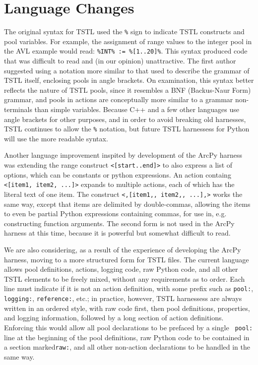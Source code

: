 \section{Language Changes}

The original syntax for TSTL \cite{NFM15} used the {\tt \%} sign to
indicate TSTL constructs and pool variables.  For example, the
assignment of range values to the integer pool in the AVL example
would read:  {\tt \%INT\% := \%[1..20]\%}.  This syntax
produced code that was difficult to read and (in our opinion) unattractive.  The first
author suggested using a notation more similar to that used to
describe the grammar of TSTL itself, enclosing pools in angle
brackets.  On examination, this syntax better reflects the nature of
TSTL pools, since it resembles a BNF (Backus-Naur Form) grammar, and
pools in actions are
conceptually more similar to a grammar non-terminals than simple variables.  Because
C++ and a few other languages use angle brackets for other purposes,
and in order to avoid breaking old harnesses, TSTL continues to allow
the {\tt \%} notation, but future TSTL harnessess for Python will use
the more readable syntax.

Another language improvement inspited by development of the ArcPy harness was
extending the range construct {\tt <[start..end]>} to also express a
list of options, which can be constants or python expressions.  An
action containg {\tt <[item1, item2, ...]>} expands to multiple
actions, each of which has the literal text of one item.  The
construct {\tt <,[item1,, item2,, ...],>} works the same way, except
that items are delimited by double-commas, allowing the items to even
be partial Python expressions containing commas, for use in,
e.g. constructing function arguments.  The second form is not used in
the ArcPy harness at this time, because it is powerful but somewhat
difficult to read.

We are also considering, as a result of the experience of developing
the ArcPy harness, moving to a more structured form for TSTL files.
The current language allows pool definitions, actions, logging code,
raw Python code, and all other TSTL elements to be freely mixed,
without any requirements as to order.  Each line must indicate if it
is not an action definition, with some prefix such as {\tt pool:},
{\tt logging:}, {\tt reference:}, etc.; in practice, however, TSTL
harnessess are always written in an ordered style, with raw code
first, then pool definitions, properties, and logging information,
followed by a long section of action definitions.  Enforcing this
would allow all pool declarations to be prefaced by a single {\tt
  pool:} line at the beginning of the pool definitions, raw Python
code to be contained in a section marked{\tt raw:}, and all other
non-action declarations to be handled in the same way. 

